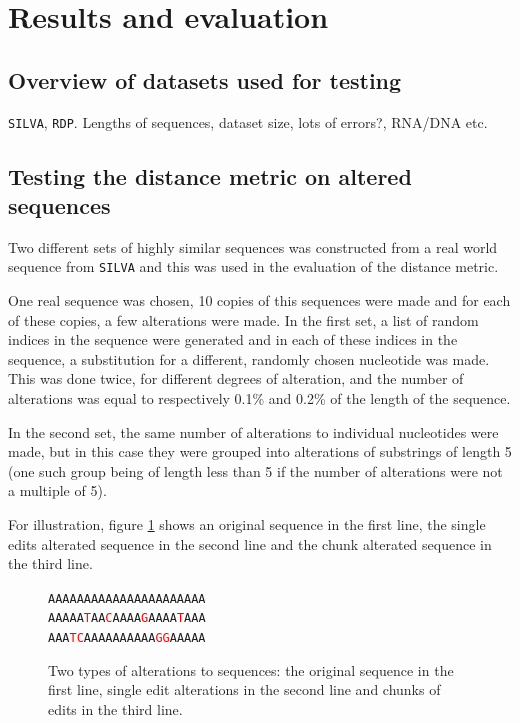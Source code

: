 \section{Results and evaluation} \label{sec:results}

\subsection{Overview of datasets used for testing}

\texttt{SILVA}, \texttt{RDP}. Lengths of sequences, dataset size, lots of
errors?, RNA/DNA etc.


\subsection{Testing the distance metric on altered sequences}

Two different sets of highly similar sequences was constructed from a real
world sequence from \texttt{SILVA} and this was used in the evaluation of the
distance metric.

One real sequence was chosen, 10 copies of this sequences were made and for
each of these copies, a few alterations were made. In the first set, a list of
random indices in the sequence were generated and in each of these indices in
the sequence, a substitution for a different, randomly chosen nucleotide was
made. This was done twice, for different degrees of alteration, and the number
of alterations was equal to respectively 0.1\% and 0.2\% of the length of the
sequence.

In the second set, the same number of alterations to individual nucleotides
were made, but in this case they were grouped into alterations of substrings of
length 5 (one such group being of length less than 5 if the number of
alterations were not a multiple of 5).

For illustration, figure \ref{fig:alterations} shows an original sequence in
the first line, the single edits alterated sequence in the second line and the
chunk alterated sequence in the third line.

\newcommand{\tc}[1]{\textcolor{red}{#1}}
\begin{figure}[H]
  \centering
  \texttt{AAAAAAAAAAAAAAAAAAAAAA} \\
  \texttt{AAAAA\tc{T}AA\tc{C}AAAA\tc{G}AAAA\tc{T}AAA} \\
  \texttt{AAA\tc{TC}AAAAAAAAAA\tc{GG}AAAAA}
  \caption{Two types of alterations to sequences: the original sequence in the
    first line, single edit alterations in the second line and chunks of edits
    in the third line.}
  \label{fig:alterations}
\end{figure}

